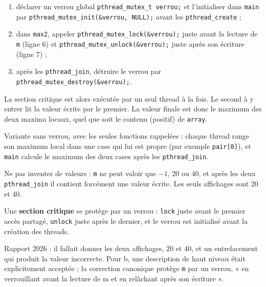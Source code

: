 \documentclass[11pt,a4paper]{article}
\providecommand{\tightlist}{\setlength{\itemsep}{0pt}\setlength{\parskip}{0pt}}
\begin{document}
\begin{enumerate}
\def\labelenumi{\arabic{enumi}.}
\tightlist
\item
  déclarer un verrou global \texttt{pthread\_mutex\_t\ verrou;\allowbreak{}} et l'initialiser dans \texttt{main} par \texttt{pthread\_mutex\_init(\allowbreak{}\&verrou,\allowbreak{}\ NULL)\allowbreak{};\allowbreak{}} avant les \texttt{pthread\_create} ;
\item
  dans \texttt{max2}, appeler \texttt{pthread\_mutex\_lock(\allowbreak{}\&verrou)\allowbreak{};\allowbreak{}} juste avant la lecture de \texttt{m} (ligne 6) et \texttt{pthread\_mutex\_unlock(\allowbreak{}\&verrou)\allowbreak{};\allowbreak{}} juste après son écriture (ligne 7) ;
\item
  après les \texttt{pthread\_join}, détruire le verrou par \texttt{pthread\_mutex\_destroy(\allowbreak{}\&verrou)\allowbreak{};\allowbreak{}}.
\end{enumerate}

La section critique est alors exécutée par un seul thread à la fois. Le second à y entrer lit la valeur écrite par le premier. La valeur finale est donc le maximum des deux maxima locaux, quel que soit le contenu (positif) de \texttt{array}.

Variante sans verrou, avec les seules fonctions rappelées : chaque thread range son maximum local dans une case qui lui est propre (par exemple \texttt{pair{[}0{]}}), et \texttt{main} calcule le maximum des deux cases après les \texttt{pthread\_join}.

\begin{piege}

Ne pas inventer de valeurs : \texttt{m} ne peut valoir que \(-1\), \(20\) ou \(40\), et après les deux \texttt{pthread\_join} il contient forcément une valeur écrite. Les seuls affichages sont 20 et 40.

\end{piege}

\begin{methode}

Une \textbf{section critique} se protège par un verrou : \texttt{lock} juste avant le premier accès partagé, \texttt{unlock} juste après le dernier, et le verrou est initialisé avant la création des threads.

\end{methode}

\begin{jury}

Rapport 2026 : il fallait donner les deux affichages, 20 et 40, et un entrelacement qui produit la valeur incorrecte. Pour b, une description de haut niveau était explicitement acceptée ; la correction canonique protège \texttt{m} par un verrou, « en verrouillant avant la lecture de m et en relâchant après son écriture ».

\end{jury}
\end{document}
